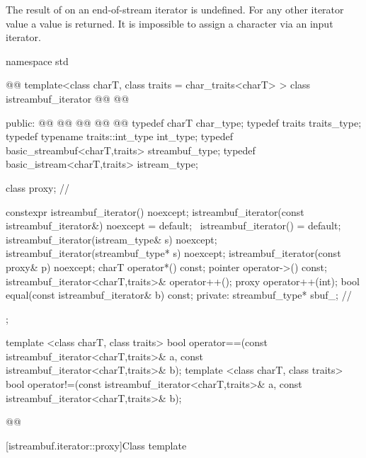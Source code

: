 \pnum
The result of
on an end-of-stream iterator is undefined.
%
For any other iterator value a
value is returned.
It is impossible to assign a character via an input iterator.

%
\begin{codeblock}
namespace std { @@
  template<class charT, class traits = char_traits<charT> >
  class istreambuf_iterator
     @@
                       @@ {
  public:
    @@
    @@
    @@
    @@
    @@
    typedef charT                         char_type;
    typedef traits                        traits_type;
    typedef typename traits::int_type     int_type;
    typedef basic_streambuf<charT,traits> streambuf_type;
    typedef basic_istream<charT,traits>   istream_type;

    class proxy;                          // \expos

    constexpr istreambuf_iterator() noexcept;
    istreambuf_iterator(const istreambuf_iterator&) noexcept = default;
    ~istreambuf_iterator() = default;
    istreambuf_iterator(istream_type& s) noexcept;
    istreambuf_iterator(streambuf_type* s) noexcept;
    istreambuf_iterator(const proxy& p) noexcept;
    charT operator*() const;
    pointer operator->() const;
    istreambuf_iterator<charT,traits>& operator++();
    proxy operator++(int);
    bool equal(const istreambuf_iterator& b) const;
  private:
    streambuf_type* sbuf_;                // \expos
  };

  template <class charT, class traits>
    bool operator==(const istreambuf_iterator<charT,traits>& a,
            const istreambuf_iterator<charT,traits>& b);
  template <class charT, class traits>
    bool operator!=(const istreambuf_iterator<charT,traits>& a,
            const istreambuf_iterator<charT,traits>& b);
}@\newtxt{\}\}}@
\end{codeblock}

[istreambuf.iterator::proxy]{Class template }

